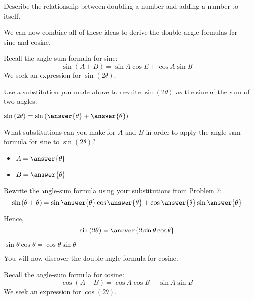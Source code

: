\documentclass[numbers]{ximera}
\begin{document}
\begin{question}
Describe the relationship between doubling a number and adding a number to itself.
\end{question}
\begin{freeResponse}
\end{freeResponse}

We can now combine all of these ideas to derive the double-angle formulas for sine and cosine.

Recall the angle-sum formula for sine:
\[\sin \left(A+B\right) = \sin A \cos B + \cos A \sin B\]
We seek an expression for $\sin\left(2\theta\right)$.

\begin{problem}
Use a substitution you made above to rewrite $\sin\left(2\theta\right)$ as the sine of the sum of two angles:

$\sin\left(2\theta\right)=\sin\left(\answer{\theta}+\answer{\theta}\right)$
\end{problem}

\begin{problem}
What substitutions can you make for $A$ and $B$ in order to apply the angle-sum formula for sine to $\sin\left(2\theta\right)$?
\begin{itemize}
	\item $A=\answer{\theta}$
	\item $B=\answer{\theta}$
\end{itemize}
\end{problem}

\begin{problem}
Rewrite the angle-sum formula using your substitutions from Problem 7:
\[\sin\left(\theta+\theta\right)=\sin\answer{\theta}\cos\answer{\theta}+\cos\answer{\theta}\sin\answer{\theta}\]
\end{problem}

\begin{question}
Hence,
\[\sin\left(2\theta\right)=\answer{2\sin\theta\cos\theta}\]
\begin{hint}
$\sin\theta\cos\theta=\cos\theta\sin\theta$
\end{hint}
\end{question}

You will now discover the double-angle formula for cosine.

Recall the angle-sum formula for cosine:
\[\cos \left(A+B\right) = \cos A \cos B - \sin A \sin B\]
We seek an expression for $\cos\left(2\theta\right)$.
\end{document}
